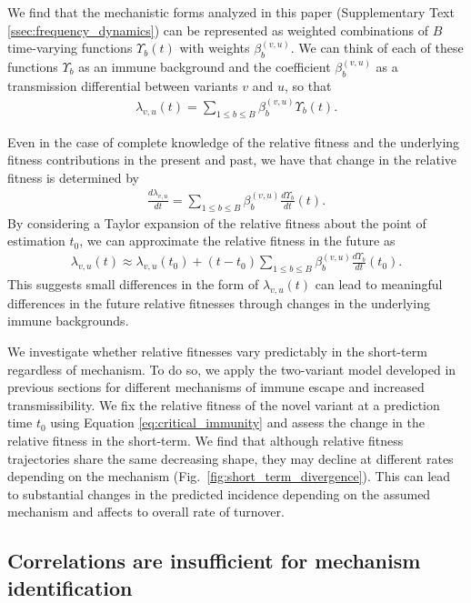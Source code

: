 \documentclass[11pt,oneside,letterpaper]{article}
\begin{document}
We find that the mechanistic forms analyzed in this paper (Supplementary Text \ref{ssec:frequency_dynamics}) can be represented as weighted combinations of $B$ time-varying functions $\Upsilon_{b}(t)$ with weights $\beta_{b}^{(v,u)}$.
We can think of each of these functions $\Upsilon_b$ as an immune background and the coefficient $\beta_{b}^{(v,u)} $ as a transmission differential between variants $v$ and $u$, so that
\begin{align}
    \lambda_{v,u}(t) = \sum_{1 \leq b \leq B} \beta_{b}^{(v,u)} \Upsilon_{b}(t).
\end{align}

Even in the case of complete knowledge of the relative fitness and the underlying fitness contributions in the present and past, we have that change in the relative fitness is determined by
\begin{align}
    \frac{d\lambda_{v,u}}{dt} = \sum_{1 \leq b \leq B} \beta_{b}^{(v,u)} \frac{d\Upsilon_{b}}{dt}(t).
\end{align}
By considering a Taylor expansion of the relative fitness about the point of estimation $t_{0}$, we can approximate the relative fitness in the future as
\begin{align}
    \lambda_{v,u}(t) \approx \lambda_{v,u}(t_{0}) + (t - t_0)\sum_{1\leq b \leq B} \beta_b^{(v,u)} \frac{d\Upsilon_b}{dt}(t_0).
\end{align}
This suggests small differences in the form of $\lambda_{v,u}(t)$ can lead to meaningful differences in the future relative fitnesses through changes in the underlying immune backgrounds.

We investigate whether relative fitnesses vary predictably in the short-term regardless of mechanism.
To do so, we apply the two-variant model developed in previous sections for different mechanisms of immune escape and increased transmissibility.
We fix the relative fitness of the novel variant at a prediction time $t_{0}$ using Equation \ref{eq:critical_immunity} and assess the change in the relative fitness in the short-term.
We find that although relative fitness trajectories share the same decreasing shape, they may decline at different rates depending on the mechanism (Fig.~\ref{fig:short_term_divergence}).
This can lead to substantial changes in the predicted incidence depending on the assumed mechanism and affects to overall rate of turnover.

\subsection*{Correlations are insufficient for mechanism identification}
\end{document}

